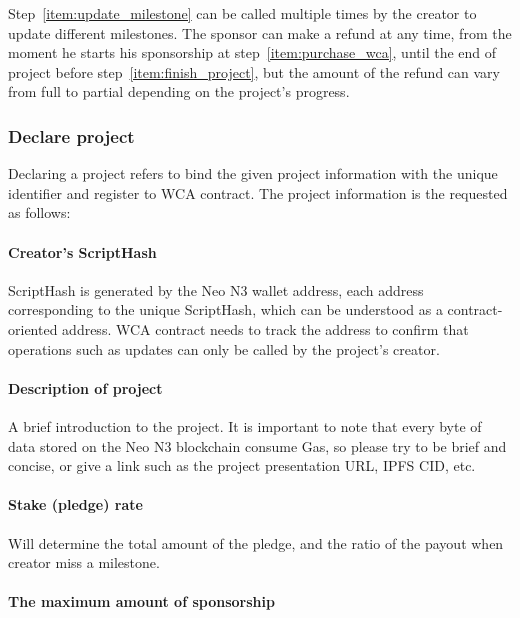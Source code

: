 \documentclass[12pt,a4paper]{article}
\begin{document}
    Step~\ref{item:update_milestone} can be called multiple times
    by the creator to update different milestones. The sponsor can
    make a refund at any time, from the moment he starts his sponsorship
    at step~\ref{item:purchase_wca}, until the end of project before
    step~\ref{item:finish_project}, but the amount of the refund can
    vary from full to partial depending on the project's progress.

    \subsubsection{Declare project}

    Declaring a project refers to bind the given project information
    with the unique identifier and register to WCA contract.
    The project information is the requested as follows:

    \paragraph{Creator's ScriptHash}

    ScriptHash is generated by the Neo N3 wallet address,
    each address corresponding to the unique ScriptHash,
    which can be understood as a contract-oriented address.
    WCA contract needs to track the address to confirm that
    operations such as updates can only be called by the
    project's creator.

    \paragraph{Description of project}

    A brief introduction to the project. It is important to note
    that every byte of data stored on the Neo N3 blockchain consume
    Gas, so please try to be brief and concise, or give a
    link such as the project presentation URL, IPFS CID, etc.

    \paragraph{Stake (pledge) rate}

    Will determine the total amount of the pledge, and the ratio
    of the payout when creator miss a milestone.

    \paragraph{The maximum amount of sponsorship}
\end{document}
